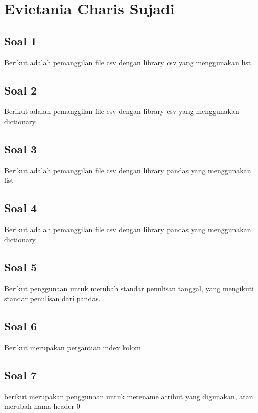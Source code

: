 \section{Evietania Charis Sujadi}
\subsection{Soal 1}
Berikut adalah pemanggilan file csv dengan library csv yang menggunakan list


\subsection{Soal 2}
Berikut adalah pemanggilan file csv dengan library csv yang menggunakan dictionary


\subsection{Soal 3}
Berikut adalah pemanggilan file csv dengan library pandas yang menggunakan list


\subsection{Soal 4}
Berikut adalah pemanggilan file csv dengan library pandas yang menggunakan dictionary


\subsection{Soal 5}
Berikut penggunaan untuk merubah standar penulisan tanggal, yang mengikuti standar penulisan dari pandas.


\subsection{Soal 6}
Berikut merupakan pergantian index kolom


\subsection{Soal 7}
berikut merupakan penggunaan untuk merename atribut yang digunakan, atau merubah nama header 0


